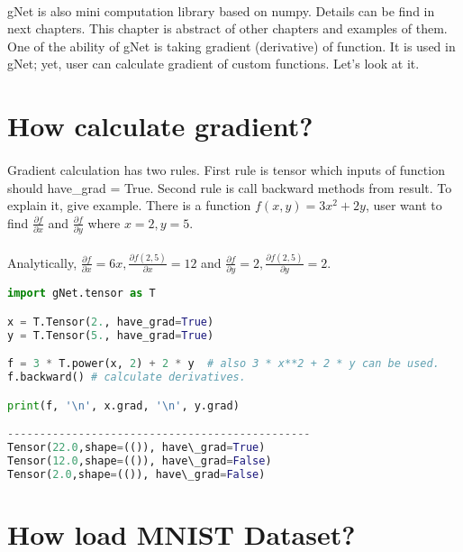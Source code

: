 \documentclass[12pt]{report}
\begin{document}
\paragraph{}
gNet is also mini computation library based on numpy. Details can be find in next chapters. This chapter is abstract of other chapters and examples of them. One of the ability of gNet is taking gradient (derivative) of function. It is used in gNet; yet, user can calculate gradient of custom functions. Let's look at it.

\section{How calculate gradient?}
\paragraph{}
Gradient calculation has two rules. First rule is tensor which inputs of function should have\_grad = True. Second rule is call backward methods from result. To explain it, give example. There is a function $f(x,y) = 3x^2 + 2y$, user want to find $\frac{\partial f}{\partial x}$ and $\frac{\partial f}{\partial y}$ where $x=2, y=5$. 

\paragraph{}
Analytically, $\frac{\partial f}{\partial x} = 6x, \frac{\partial f(2,5)}{\partial x} = 12$ and  $\frac{\partial f}{\partial y} = 2, \frac{\partial f(2,5)}{\partial y} = 2$. 

\begin{lstlisting}[language=Python, numbers=none, caption={Calculation of gradient.}, label={ex:grad-calc}]
import gNet.tensor as T

x = T.Tensor(2., have_grad=True)
y = T.Tensor(5., have_grad=True)

f = 3 * T.power(x, 2) + 2 * y  # also 3 * x**2 + 2 * y can be used.
f.backward() # calculate derivatives. 

print(f, '\n', x.grad, '\n', y.grad)

-----------------------------------------------
Tensor(22.0,shape=(()), have\_grad=True) 
Tensor(12.0,shape=(()), have\_grad=False)
Tensor(2.0,shape=(()), have\_grad=False)
\end{lstlisting}



\section{How load MNIST Dataset?}
\end{document}
